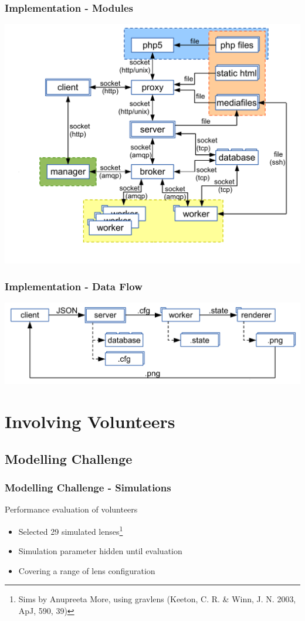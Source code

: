 \documentclass[aspectratio=1610]{beamer}
\begin{document}
\begin{frame}
  \frametitle{Implementation - Modules}
  \centering
  \includegraphics[height=\textheight]{imgs/whole_setup}
\end{frame}

\begin{frame}
  \frametitle{Implementation - Data Flow}
  \includegraphics[width=\textwidth]{imgs/dataflow}
\end{frame}


\section{Involving Volunteers}
\subsection{Modelling Challenge}

\begin{frame}
  \frametitle{Modelling Challenge - Simulations}
  Performance evaluation of volunteers
  \begin{itemize}
    \item Selected 29 simulated lenses\footnote{Sims by Anupreeta More, using gravlens (Keeton, C. R. \& Winn, J. N. 2003, ApJ, 590, 39)}
    \item Simulation parameter hidden until evaluation
    \item Covering a range of lens configuration
  \end{itemize}
\end{frame}
\end{document}
